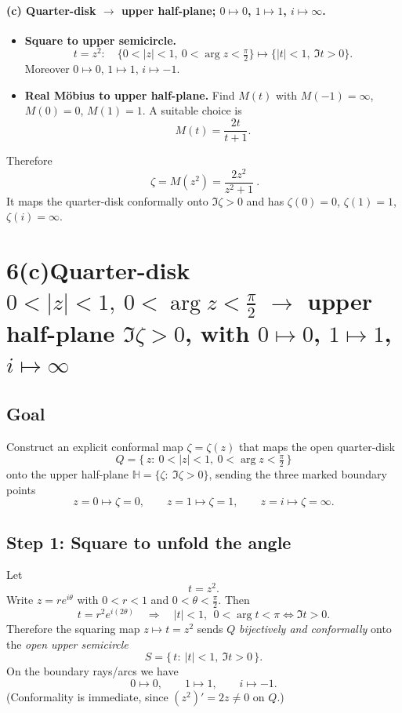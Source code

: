 \documentclass[11pt]{article}
\begin{document}
	\bigskip
	
	\paragraph{(c) Quarter-disk $\to$ upper half-plane; $0\mapsto0$, $1\mapsto1$, $i\mapsto\infty$.}
	\begin{itemize}
		\setlength{\itemsep}{0.4em}
		\item \textbf{Square to upper semicircle.}
		\[
		t=z^{2}:\quad \{0<|z|<1,\ 0<\arg z<\tfrac{\pi}{2}\}
		\longmapsto \{|t|<1,\ \Im t>0\}.
		\]
		Moreover $0\mapsto0$, $1\mapsto1$, $i\mapsto-1$.
		\item \textbf{Real Möbius to upper half-plane.}
		Find $M(t)$ with $M(-1)=\infty$, $M(0)=0$, $M(1)=1$.
		A suitable choice is
		\[
		M(t)=\frac{2t}{t+1}.
		\]
	\end{itemize}
	Therefore
	\[
	\boxed{\ \zeta=M(z^{2})=\frac{2z^{2}}{z^{2}+1}\ }.
	\]
	It maps the quarter-disk conformally onto $\Im\zeta>0$ and has
	$\zeta(0)=0$, $\zeta(1)=1$, $\zeta(i)=\infty$.
	
	
	\section*{6(c)\quad Quarter-disk $0<|z|<1,\ 0<\arg z<\tfrac{\pi}{2}$
		$\longrightarrow$ upper half-plane $\Im\zeta>0$,
		with $0\mapsto0$, $1\mapsto1$, $i\mapsto\infty$}
	
	\subsection*{Goal}
	Construct an explicit conformal map $\zeta=\zeta(z)$ that maps the open quarter-disk
	\[
	Q=\{\,z:\ 0<|z|<1,\ 0<\arg z<\tfrac{\pi}{2}\,\}
	\]
	onto the upper half-plane $\mathbb H=\{\zeta:\ \Im\zeta>0\}$, sending the three marked boundary
	points
	\[
	z=0 \longmapsto \zeta=0,\qquad
	z=1 \longmapsto \zeta=1,\qquad
	z=i \longmapsto \zeta=\infty .
	\]
	
	\subsection*{Step 1: Square to unfold the angle}
	Let
	\[
	t=z^{2}.
	\]
	Write $z=re^{i\theta}$ with $0<r<1$ and $0<\theta<\frac{\pi}{2}$. Then
	\[
	t=r^{2}e^{i(2\theta)}\quad\Rightarrow\quad |t|<1,\ \ 0<\arg t<\pi \iff \Im t>0.
	\]
	Therefore the squaring map $z\mapsto t=z^{2}$ sends $Q$ \emph{bijectively and conformally}
	onto the \emph{open upper semicircle}
	\[
	S=\{\,t:\ |t|<1,\ \Im t>0\,\}.
	\]
	On the boundary rays/arcs we have
	\[
	0\mapsto 0,\qquad 1\mapsto 1,\qquad i\mapsto -1.
	\]
	(Conformality is immediate, since $(z^{2})'=2z\neq 0$ on $Q$.)
	
\end{document}

